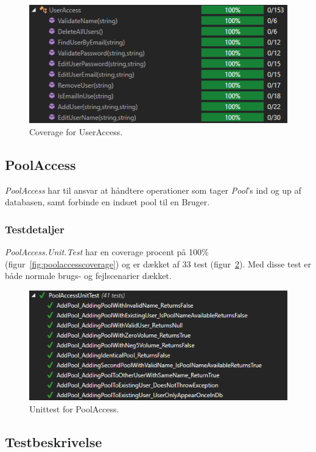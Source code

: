 \begin{figure}[h]
	\centering
	\includegraphics[width=0.7\linewidth]{figs/test/useraccesscoverage}
	\caption{Coverage for UserAccess.}
	\label{fig:useraccesscoverage}
\end{figure} 


\subsection{PoolAccess}
\textit{PoolAccess} har til ansvar at håndtere operationer som tager \textit{Pool}'s ind og up af databasen, samt forbinde en indsæt pool til en Bruger. 

\subsubsection{Testdetaljer}
\textit{PoolAccess.Unit.Test} har en coverage procent på 100\% (figur~\ref{fig:poolaccesscoverage}) og er dækket af 33 test (figur~\ref{fig:poolaccessunittest}). Med disse test er både normale brugs- og fejlscenarier dækket.

\begin{figure}[h]
	\centering
	\includegraphics[width=0.8\linewidth]{figs/test/poolaccessunittest}
	\caption{Unittest for PoolAccess.}
	\label{fig:poolaccessunittest}
\end{figure}

\subsection{Testbeskrivelse}

